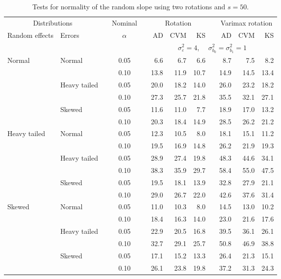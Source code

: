 \begin{table}[ht]
\caption{\label{tab:simb1s50-alt}Tests for normality of the random slope using two rotations and $s = 50$.}
\begin{scriptsize}
\begin{center}
\begin{tabular}{ll p{.1cm} c p{.1cm} rrr p{.1cm} rrr}
  \hline
  \multicolumn{2}{c}{Distributions}& & Nominal & &  \multicolumn{3}{c}{Rotation} & & \multicolumn{3}{c}{Varimax rotation} \\ \cline{1-2} \cline{6-8} \cline{10-12}   
  Random effects & Errors & & $\alpha$ & & AD & CVM & KS & & AD & CVM & KS \\ 
   \hline
& && && \multicolumn{7}{c}{$\sigma_{\varepsilon}^2 = 4$, \ \ $\sigma_{b_0}^2 = \sigma_{b_1}^2 = 1$} \\ \cline{6-12}
Normal       & Normal       && 0.05 &&   6.6 & 6.7 & 6.6 &   & 8.7 & 7.5 & 8.2 \\ 
             &              && 0.10 &&   13.8 & 11.9 & 10.7 &   & 14.9 & 14.5 & 13.4 \\ 
             & Heavy tailed && 0.05 &&   20.0 & 18.2 & 14.0 &   & 26.0 & 23.2 & 18.2 \\ 
             &              && 0.10 &&   27.3 & 25.7 & 21.8 &   & 35.5 & 32.1 & 27.1 \\ 
             & Skewed       && 0.05 &&   11.6 & 11.0 & 7.7 &   & 18.9 & 17.0 & 13.2 \\ 
             &              && 0.10 &&   20.3 & 18.4 & 14.9 &   & 28.5 & 26.2 & 21.2 \\ 
Heavy tailed & Normal       && 0.05 &&   12.3 & 10.5 & 8.0 &   & 18.1 & 15.1 & 11.2 \\ 
             &              && 0.10 &&   19.5 & 16.9 & 14.8 &   & 26.2 & 21.9 & 19.3 \\ 
             & Heavy tailed && 0.05 &&   28.9 & 27.4 & 19.8 &   & 48.3 & 44.6 & 34.1 \\ 
             &              && 0.10 &&   38.3 & 35.9 & 29.7 &   & 58.4 & 55.0 & 47.5 \\ 
             & Skewed       && 0.05 &&   19.5 & 18.1 & 13.9 &   & 32.8 & 27.9 & 21.1 \\ 
             &              && 0.10 &&   29.0 & 26.7 & 22.0 &   & 42.6 & 37.6 & 31.4 \\ 
Skewed       & Normal       && 0.05 &&   11.0 & 10.3 & 8.0 &   & 14.5 & 13.0 & 10.2 \\ 
             &              && 0.10 &&   18.4 & 16.3 & 14.0 &   & 23.0 & 21.6 & 17.6 \\ 
             & Heavy tailed && 0.05 &&   22.9 & 20.5 & 16.8 &   & 39.5 & 36.1 & 26.1 \\ 
             &              && 0.10 &&   32.7 & 29.1 & 25.7 &   & 50.8 & 46.9 & 38.8 \\ 
             & Skewed       && 0.05 &&   17.1 & 15.2 & 13.3 &   & 26.4 & 21.3 & 15.1 \\ 
             &              && 0.10 &&   26.1 & 23.8 & 19.8 &   & 37.2 & 31.3 & 24.3 \\ 


\end{tabular}
\end{center}
\end{scriptsize}
\end{table}
